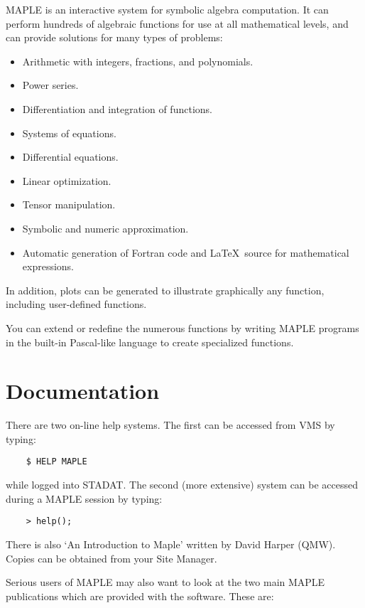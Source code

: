 MAPLE is an interactive system for symbolic algebra computation. It can
perform hundreds of algebraic functions for use at all mathematical
levels, and can provide solutions for many types of problems:

\begin{itemize}
\item Arithmetic with integers, fractions, and polynomials.
\item Power series.
\item Differentiation and integration of functions.
\item Systems of equations.
\item Differential equations.
\item Linear optimization.
\item Tensor manipulation.
\item Symbolic and numeric approximation.
\item Automatic generation of Fortran code and \LaTeX\ source for mathematical
expressions.
\end{itemize}

In addition, plots can be generated to illustrate graphically any
function, including user-defined functions.

You can extend or redefine the numerous functions by writing MAPLE
programs in the built-in Pascal-like language to create specialized
functions.

\section{Documentation}

There are two on-line help systems. The first can be accessed from VMS by
typing:

\begin{verbatim}
    $ HELP MAPLE
\end{verbatim}

while logged into STADAT. The second (more extensive) system can be
accessed during a MAPLE session by typing:

\begin{verbatim}
    > help();
\end{verbatim}

There is also `An Introduction to Maple' written by David Harper (QMW).
Copies can be obtained from your Site Manager.

Serious users of MAPLE may also want to look at the two main MAPLE publications
which are provided with the software. These are:

